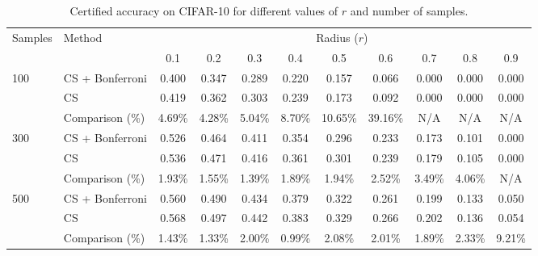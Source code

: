 \begin{table}[htbp]
    \centering
    \caption{Certified accuracy on CIFAR-10 for different values of $r$ and number of samples.}
    \label{tab:certified-accuracy}
    \renewcommand{\arraystretch}{1.2}
    \begin{tabular}{@{}ll*{9}{c}@{}}
        \toprule
        \multirow{2}{*}{Samples} & \multirow{2}{*}{Method} & \multicolumn{9}{c}{Radius ($r$)} \\
        \cmidrule(l){3-11}
        & & 0.1 & 0.2 & 0.3 & 0.4 & 0.5 & 0.6 & 0.7 & 0.8 & 0.9 \\
        \midrule
        \multirow{3}{*}{100}
        & CS + Bonferroni & 0.400 & 0.347 & 0.289 & 0.220 & 0.157 & 0.066 & 0.000 & 0.000 & 0.000 \\
        & CS              & 0.419 & 0.362 & 0.303 & 0.239 & 0.173 & 0.092 & 0.000 & 0.000 & 0.000 \\
        & Comparison (\%) & 4.69\% & 4.28\% & 5.04\% & 8.70\% & 10.65\% & 39.16\% & N/A & N/A & N/A \\
        \midrule
        \multirow{3}{*}{300}
        & CS + Bonferroni & 0.526 & 0.464 & 0.411 & 0.354 & 0.296 & 0.233 & 0.173 & 0.101 & 0.000 \\
        & CS              & 0.536 & 0.471 & 0.416 & 0.361 & 0.301 & 0.239 & 0.179 & 0.105 & 0.000 \\
        & Comparison (\%) & 1.93\% & 1.55\% & 1.39\% & 1.89\% & 1.94\% & 2.52\% & 3.49\% & 4.06\% & N/A \\
        \midrule
        \multirow{3}{*}{500}
        & CS + Bonferroni & 0.560 & 0.490 & 0.434 & 0.379 & 0.322 & 0.261 & 0.199 & 0.133 & 0.050 \\
        & CS              & 0.568 & 0.497 & 0.442 & 0.383 & 0.329 & 0.266 & 0.202 & 0.136 & 0.054 \\
        & Comparison (\%) & 1.43\% & 1.33\% & 2.00\% & 0.99\% & 2.08\% & 2.01\% & 1.89\% & 2.33\% & 9.21\% \\
        \bottomrule
    \end{tabular}
\end{table}
